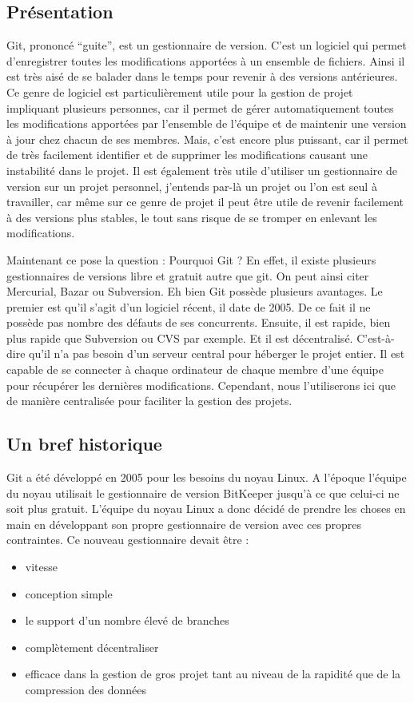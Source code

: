 \documentclass[a4paper]{article}
\begin{document}
\subsection{Présentation}

Git, prononcé “guite”, est un gestionnaire de version. C'est un logiciel qui permet d'enregistrer toutes les modifications apportées à un ensemble de fichiers. Ainsi il est très aisé de se \og balader dans le temps \fg pour revenir à des versions antérieures. Ce genre de logiciel est particulièrement utile pour la gestion de projet impliquant plusieurs personnes, car il permet de gérer automatiquement toutes les modifications apportées par l'ensemble de l'équipe et de maintenir une version à jour chez chacun de ses membres. Mais, c'est encore plus puissant, car il permet de très facilement identifier et de supprimer les modifications causant une instabilité dans le projet. Il est également très utile d'utiliser un gestionnaire de version sur un projet personnel, j'entends par-là un projet ou l'on est seul à travailler, car même sur ce genre de projet il peut être utile de revenir facilement à des versions plus stables, le tout sans risque de se tromper en enlevant les modifications.

Maintenant ce pose la question : Pourquoi Git ? En effet, il existe plusieurs gestionnaires de versions libre et gratuit autre que git. On peut ainsi citer Mercurial, Bazar ou Subversion. Eh bien Git possède plusieurs avantages. Le premier est qu'il s'agit d'un logiciel récent, il date de 2005. De ce fait il ne possède pas nombre des défauts de ses concurrents. Ensuite, il est rapide, bien plus rapide que Subversion ou CVS par exemple. Et il est décentralisé. C'est-à-dire qu'il n'a pas besoin d'un serveur central pour héberger le projet entier. Il est capable de se connecter à chaque ordinateur de chaque membre d'une équipe pour récupérer les dernières modifications. Cependant, nous l'utiliserons ici que de manière centralisée pour faciliter la gestion des projets.

\subsection{Un bref historique}

Git a été développé en 2005 pour les besoins du noyau Linux. A l'époque l'équipe du noyau utilisait le gestionnaire de version BitKeeper jusqu'à ce que celui-ci ne soit plus gratuit. L'équipe du noyau Linux a donc décidé de prendre les choses en main en développant son propre gestionnaire de version avec ces propres contraintes. Ce nouveau gestionnaire devait être :
\begin{itemize}

\item vitesse
\item conception simple
\item le support d'un nombre élevé de branches
\item complètement décentraliser
\item efficace dans la gestion de gros projet tant au niveau de la rapidité que de la compression des données

\end{itemize}
\end{document}
